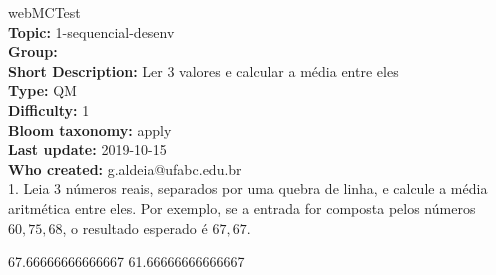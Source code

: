 \documentclass[10pt,brazil,a4paper]{exam}
\begin{document}
\pagestyle{empty}

\noindent\Huge{webMCTest}\normalsize\vspace{5mm}\\
\noindent\textbf{Topic:} 1-sequencial-desenv\\
\noindent\textbf{Group:} \\
\noindent\textbf{Short Description:} Ler 3 valores e calcular a média entre eles\\
\noindent\textbf{Type:} QM\\
\noindent\textbf{Difficulty:} 1\\
\noindent\textbf{Bloom taxonomy:} apply\\
\noindent\textbf{Last update:} 2019-10-15\\
\noindent\textbf{Who created:} g.aldeia@ufabc.edu.br\\

 \hspace{-1mm} 1. %
Leia 3 números reais, separados por uma quebra de linha, e calcule a média aritmética entre eles. Por exemplo, se a entrada for composta pelos números $60, 75, 68$, o resultado esperado é $67,67$.

\begin{comment}
{"input": [[60, 75, 68], [75, 62, 74], [79, 64, 63]], "output": [[67.66666666666667], [70.33333333333333], [68.66666666666667]]}
\end{comment}

\n\n

\vspace{2mm}\begin{oneparchoices}
\choice {}67.66666666666667
\choice {}61.66666666666667
\end{oneparchoices}\vspace{0mm}
\end{document}
